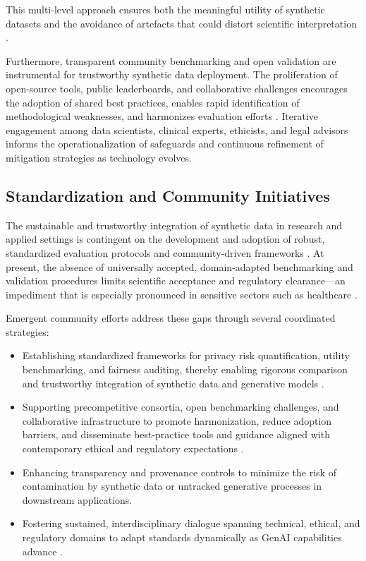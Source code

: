 \documentclass[sigconf]{acmart}
\begin{document}
This multi-level approach ensures both the meaningful utility of synthetic datasets and the avoidance of artefacts that could distort scientific interpretation \cite{ref6}\cite{ref11}\cite{ref75}\cite{ref81}\cite{ref89}.

Furthermore, transparent community benchmarking and open validation are instrumental for trustworthy synthetic data deployment. The proliferation of open-source tools, public leaderboards, and collaborative challenges encourages the adoption of shared best practices, enables rapid identification of methodological weaknesses, and harmonizes evaluation efforts \cite{ref82}\cite{ref88}\cite{ref89}. Iterative engagement among data scientists, clinical experts, ethicists, and legal advisors informs the operationalization of safeguards and continuous refinement of mitigation strategies as technology evolves.

\subsection{Standardization and Community Initiatives}

The sustainable and trustworthy integration of synthetic data in research and applied settings is contingent on the development and adoption of robust, standardized evaluation protocols and community-driven frameworks \cite{ref88}\cite{ref89}. At present, the absence of universally accepted, domain-adapted benchmarking and validation procedures limits scientific acceptance and regulatory clearance—an impediment that is especially pronounced in sensitive sectors such as healthcare \cite{ref6}\cite{ref7}\cite{ref88}\cite{ref89}.

Emergent community efforts address these gaps through several coordinated strategies:

\begin{itemize}
    \item Establishing standardized frameworks for privacy risk quantification, utility benchmarking, and fairness auditing, thereby enabling rigorous comparison and trustworthy integration of synthetic data and generative models \cite{ref81}\cite{ref82}\cite{ref88}\cite{ref89}.
    \item Supporting precompetitive consortia, open benchmarking challenges, and collaborative infrastructure to promote harmonization, reduce adoption barriers, and disseminate best-practice tools and guidance aligned with contemporary ethical and regulatory expectations \cite{ref89}.
    \item Enhancing transparency and provenance controls to minimize the risk of contamination by synthetic data or untracked generative processes in downstream applications.
    \item Fostering sustained, interdisciplinary dialogue spanning technical, ethical, and regulatory domains to adapt standards dynamically as GenAI capabilities advance \cite{ref60}\cite{ref75}\cite{ref81}\cite{ref88}.
\end{itemize}
\end{document}
